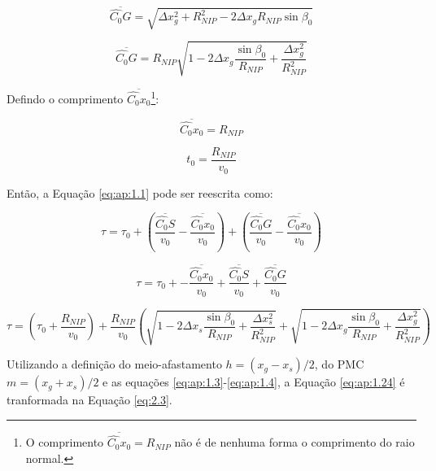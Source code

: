\begin{equation}
 \label{eq:ap:1.18}
 \overline{\hat{C_0}G} = \sqrt{ \Delta x_{g}^2 + R_{NIP}^2 - 2 \Delta x_g R_{NIP} \sin{\beta_0} }
\end{equation}

\begin{equation}
 \label{eq:ap:1.19}
 \overline{\hat{C_0}G} = 
 R_{NIP} \sqrt{  1 - 2 \Delta x_g \frac{\sin{\beta_0}}{R_{NIP}} + \frac{\Delta x_{g}^2}{R_{NIP}^2} }
\end{equation}

Defindo o comprimento $\overline{\hat{C_0}x_0}$\footnote{O comprimento
$\overline{\hat{C_0}x_0} = R_{NIP}$ não é de nenhuma forma o comprimento do raio normal.}:

\begin{equation}
 \label{eq:ap:1.20}
 \overline{\hat{C_0}x_0} = R_{NIP}
\end{equation}

\begin{equation}
 \label{eq:ap:1.21}
t_0 = \frac{R_{NIP}}{v_0}
\end{equation}

Então, a Equação \ref{eq:ap:1.1} pode ser reescrita como:

\begin{equation}
 \label{eq:ap:1.22}
\tau = \tau_0 + \left( \frac{\overline{\hat{C_0}S}}{v_0} - \frac{\overline{\hat{C_0}x_0}}{v_0} \right)
+ \left( \frac{\overline{\hat{C_0}G}}{v_0} - \frac{\overline{\hat{C_0}x_0}}{v_0} \right)
\end{equation}

\begin{equation}
 \label{eq:ap:1.23}
\tau = \tau_0 + - \frac{\overline{\hat{C_0}x_0}}{v_0} + \frac{\overline{\hat{C_0}S}}{v_0}
+ \frac{\overline{\hat{C_0}G}}{v_0}
\end{equation}

\begin{equation}
 \label{eq:ap:1.24}
\tau = \left( \tau_0 + \frac{R_{NIP}}{v_0} \right)
+ \frac{R_{NIP}}{v_0} \left( \sqrt{  1 - 2 \Delta x_s \frac{\sin{\beta_0}}{R_{NIP}} + \frac{\Delta x_{s}^2}{R_{NIP}^2} }
+ \sqrt{  1 - 2 \Delta x_g \frac{\sin{\beta_0}}{R_{NIP}} + \frac{\Delta x_{g}^2}{R_{NIP}^2} } \right)
\end{equation}

Utilizando a definição do meio-afastamento $h=(x_g-x_s)/2$, do PMC $m=(x_g + x_s)/2$ 
e as equações \ref{eq:ap:1.3}-\ref{eq:ap:1.4}, a
Equação \ref{eq:ap:1.24} é tranformada na Equação \ref{eq:2.3}.